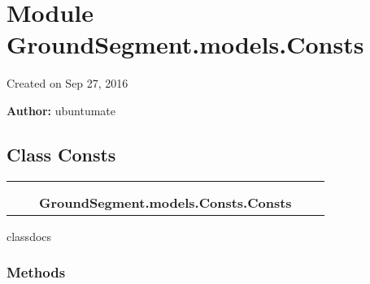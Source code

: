 %
%
%


\section{Module GroundSegment.models.Consts}

    \label{GroundSegment:models:Consts}
Created on Sep 27, 2016

\textbf{Author:} ubuntumate





\subsection{Class Consts}

    \label{GroundSegment:models:Consts:Consts}
\begin{tabular}{cccccc}
\multicolumn{2}{r}{\settowidth{\BCL}{object}\multirow{2}{\BCL}{object}}
&&
  \\\cline{3-3}
  &&\multicolumn{1}{c|}{}
&&
  \\
&&\multicolumn{2}{l}{\textbf{GroundSegment.models.Consts.Consts}}
\end{tabular}

classdocs



  \subsubsection{Methods}


